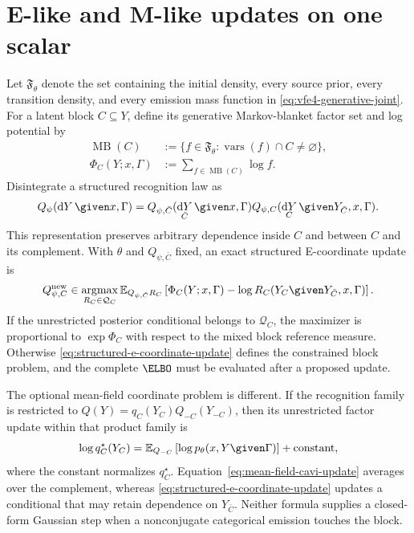 \section{E-like and M-like updates on one scalar}

Let $\mathfrak F_\theta$ denote the set containing the initial density, every source prior, every transition density, and every emission mass function in \cref{eq:vfe4-generative-joint}. For a latent block $C\subseteq Y$, define its generative Markov-blanket factor set and log potential by
\begin{equation}
\begin{aligned}
\operatorname{MB}(C)
&:=\{f\in\mathfrak F_\theta:
\operatorname{vars}(f)\cap C\ne\varnothing\},\\
\Phi_C(Y;x,\Gamma)
&:=\sum_{f\in\operatorname{MB}(C)}\log f.
\end{aligned}
\label{eq:generative-markov-blanket-potential}
\end{equation}
Disintegrate a structured recognition law as
\begin{equation}
Q_\psi(\mathop{\mathrm dY}\given x,\Gamma)
=Q_{\psi,\bar C}(\mathop{\mathrm dY}_{\bar C}\given x,\Gamma)
Q_{\psi,C}(\mathop{\mathrm dY}_C\given
Y_{\bar C},x,\Gamma).
\label{eq:structured-block-disintegration}
\end{equation}
This representation preserves arbitrary dependence inside $C$ and between $C$ and its complement. With $\theta$ and $Q_{\psi,\bar C}$ fixed, an exact structured E-coordinate update is
\begin{equation}
Q_{\psi,C}^{\mathrm{new}}
\in\operatorname*{argmax}_{R_C\in\mathcal Q_C}
\mathbb E_{Q_{\psi,\bar C}R_C}
\left[
\Phi_C(Y;x,\Gamma)-\log R_C(Y_C\given Y_{\bar C},x,\Gamma)
\right].
\label{eq:structured-e-coordinate-update}
\end{equation}
If the unrestricted posterior conditional belongs to $\mathcal Q_C$, the maximizer is proportional to $\exp\Phi_C$ with respect to the mixed block reference measure. Otherwise \cref{eq:structured-e-coordinate-update} defines the constrained block problem, and the complete $\ELBO$ must be evaluated after a proposed update.

The optional mean-field coordinate problem is different. If the recognition family is restricted to $Q(Y)=q_C(Y_C)Q_{-C}(Y_{-C})$, then its unrestricted factor update within that product family is
\begin{equation}
\log q_C^\star(Y_C)
=\mathbb E_{Q_{-C}}
\left[
\log p_\theta(x,Y\given\Gamma)
\right]
+\operatorname{constant},
\label{eq:mean-field-cavi-update}
\end{equation}
where the constant normalizes $q_C^\star$. Equation~\eqref{eq:mean-field-cavi-update} averages over the complement, whereas \cref{eq:structured-e-coordinate-update} updates a conditional that may retain dependence on $Y_{\bar C}$. Neither formula supplies a closed-form Gaussian step when a nonconjugate categorical emission touches the block.

